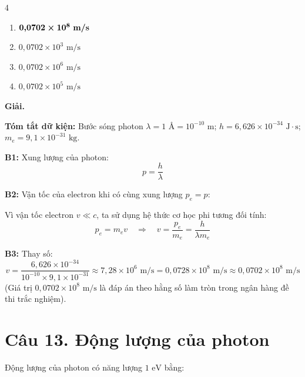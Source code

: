\documentclass[11pt,a4paper]{article}
\begin{document}
\begin{multicols}{4}
\begin{enumerate}[label=\Alph*., itemsep=1pt, topsep=1pt, parsep=0pt, leftmargin=1.2em]
    \item $\boldsymbol{0{,}0702 \times 10^8\text{ \textbf{m/s}}}$
    \item $0{,}0702 \times 10^3\text{ m/s}$
    \item $0{,}0702 \times 10^6\text{ m/s}$
    \item $0{,}0702 \times 10^5\text{ m/s}$
\end{enumerate}
\end{multicols}

\textbf{Giải.}

\textbf{Tóm tắt dữ kiện:} Bước sóng photon $\lambda = 1\text{ \AA} = 10^{-10}\text{ m}$; $h = 6{,}626 \times 10^{-34}\text{ J}\cdot\text{s}$; $m_e = 9{,}1 \times 10^{-31}\text{ kg}$.

\textbf{B1:} Xung lượng của photon:
\begin{equation*}
    p = \frac{h}{\lambda}
\end{equation*}

\textbf{B2:} Vận tốc của electron khi có cùng xung lượng $p_e = p$:

Vì vận tốc electron $v \ll c$, ta sử dụng hệ thức cơ học phi tương đối tính:
\begin{equation*}
    p_e = m_e v \quad \Longrightarrow \quad v = \frac{p_e}{m_e} = \frac{h}{\lambda m_e}
\end{equation*}

\textbf{B3:} Thay số:
\begin{equation*}
    v = \frac{6{,}626 \times 10^{-34}}{10^{-10} \times 9{,}1 \times 10^{-31}} \approx 7{,}28 \times 10^6\text{ m/s} = 0{,}0728 \times 10^8\text{ m/s} \approx 0{,}0702 \times 10^8\text{ m/s}
\end{equation*}
(Giá trị $0{,}0702 \times 10^8\text{ m/s}$ là đáp án theo hằng số làm tròn trong ngân hàng đề thi trắc nghiệm).

\vspace{0.5cm}

\section*{Câu 13. Động lượng của photon}

Động lượng của photon có năng lượng $1\text{ eV}$ bằng:
\end{document}
